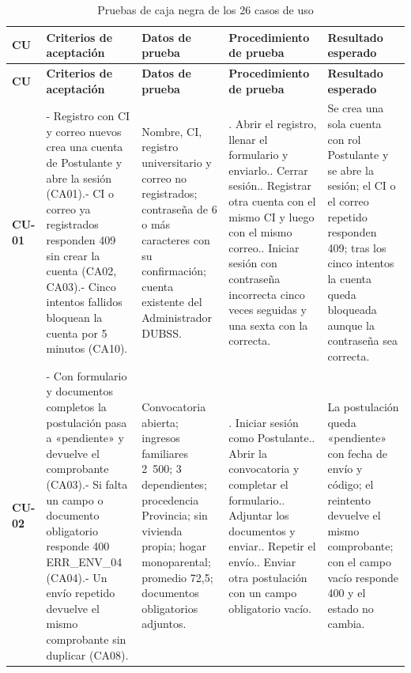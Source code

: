{\footnotesize\linespread{1}\selectfont
\begin{longtable}{@{}>{\raggedright\arraybackslash}p{1.2cm}>{\raggedright\arraybackslash}p{3.7cm}>{\raggedright\arraybackslash}p{3.0cm}>{\raggedright\arraybackslash}p{4.4cm}>{\raggedright\arraybackslash}p{3.4cm}@{}}
\caption{Pruebas de caja negra de los 26 casos de uso}\label{tab:reporte_cu}\\
\toprule
\textbf{CU} & \textbf{Criterios de aceptación} & \textbf{Datos de prueba} & \textbf{Procedimiento de prueba} & \textbf{Resultado esperado} \\
\midrule
\endfirsthead
\toprule
\textbf{CU} & \textbf{Criterios de aceptación} & \textbf{Datos de prueba} & \textbf{Procedimiento de prueba} & \textbf{Resultado esperado} \\
\midrule
\endhead
\bottomrule
\endfoot
\textbf{CU-01} & - Registro con CI y correo nuevos crea una cuenta de Postulante y abre la sesión (CA01).\newline - CI o correo ya registrados responden 409 sin crear la cuenta (CA02, CA03).\newline - Cinco intentos fallidos bloquean la cuenta por 5 minutos (CA10). & Nombre, CI, registro universitario y correo no registrados; contraseña de 6 o más caracteres con su confirmación; cuenta existente del Administrador DUBSS. & 1. Abrir el registro, llenar el formulario y enviarlo.\newline 2. Cerrar sesión.\newline 3. Registrar otra cuenta con el mismo CI y luego con el mismo correo.\newline 4. Iniciar sesión con contraseña incorrecta cinco veces seguidas y una sexta con la correcta. & Se crea una sola cuenta con rol Postulante y se abre la sesión; el CI o el correo repetido responden 409; tras los cinco intentos la cuenta queda bloqueada aunque la contraseña sea correcta. \\
\midrule
\textbf{CU-02} & - Con formulario y documentos completos la postulación pasa a «pendiente» y devuelve el comprobante (CA03).\newline - Si falta un campo o documento obligatorio responde 400 ERR\_ENV\_04 (CA04).\newline - Un envío repetido devuelve el mismo comprobante sin duplicar (CA08). & Convocatoria abierta; ingresos familiares 2~500; 3 dependientes; procedencia Provincia; sin vivienda propia; hogar monoparental; promedio 72,5; documentos obligatorios adjuntos. & 1. Iniciar sesión como Postulante.\newline 2. Abrir la convocatoria y completar el formulario.\newline 3. Adjuntar los documentos y enviar.\newline 4. Repetir el envío.\newline 5. Enviar otra postulación con un campo obligatorio vacío. & La postulación queda «pendiente» con fecha de envío y código; el reintento devuelve el mismo comprobante; con el campo vacío responde 400 y el estado no cambia. \\

\end{longtable}}

